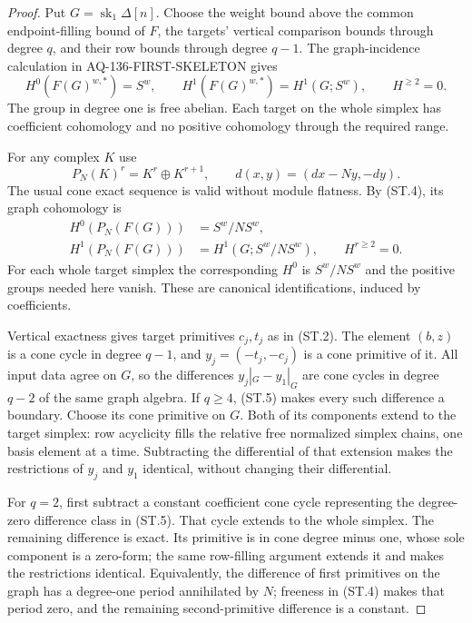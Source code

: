 \begin{proof}
Put \(G=\operatorname{sk}_1\Delta[n]\). Choose the weight
bound above the common endpoint-filling bound of \(F\), the
targets' vertical comparison bounds through degree \(q\),
and their row bounds through degree \(q-1\).
The graph-incidence calculation in AQ-136-FIRST-SKELETON gives
\[
 H^0(F(G)^{w,*})=S^w,\qquad
 H^1(F(G)^{w,*})=H^1(G;S^w),\qquad H^{\geq2}=0.          \tag{ST.4}
\]
The group in degree one is free abelian. Each target on the
whole simplex has coefficient cohomology and no positive
cohomology through the required range.

For any complex \(K\) use
\[
 P_N(K)^r=K^r\oplus K^{r+1},\qquad
 d(x,y)=(dx-Ny,-dy).
\]
The usual cone exact sequence is valid without module flatness.
By (ST.4), its graph cohomology is
\[
 \begin{aligned}
 H^0(P_N(F(G)))&=S^w/NS^w,\\
 H^1(P_N(F(G)))&=H^1(G;S^w/NS^w),\qquad H^{r\geq2}=0.
 \end{aligned}
                                                               \tag{ST.5}
\]
For each whole target simplex the corresponding \(H^0\) is
\(S^w/NS^w\) and the positive groups needed here vanish.
These are canonical identifications, induced by coefficients.

Vertical exactness gives target primitives \(c_j,t_j\) as in
(ST.2). The element \((b,z)\) is a cone cycle in degree
\(q-1\), and \(y_j=(-t_j,-c_j)\) is a cone primitive of it.
All input data agree on \(G\), so the differences
\(y_j|_G-y_1|_G\) are cone cycles in degree \(q-2\) of the
same graph algebra. If \(q\geq4\), (ST.5) makes every such
difference a boundary. Choose its cone primitive on \(G\).
Both of its components extend to the target simplex: row
acyclicity fills the relative free normalized simplex chains,
one basis element at a time. Subtracting the differential of
that extension makes the restrictions of \(y_j\) and \(y_1\)
identical, without changing their differential.

For \(q=2\), first subtract a constant coefficient cone cycle
representing the degree-zero difference class in (ST.5).
That cycle extends to the whole simplex. The remaining difference
is exact. Its primitive is in cone degree minus one, whose sole
component is a zero-form; the same row-filling argument extends
it and makes the restrictions identical. Equivalently, the
difference of first primitives on the graph has a degree-one
period annihilated by \(N\); freeness in (ST.4) makes that period
zero, and the remaining second-primitive difference is a constant.


\end{proof}
